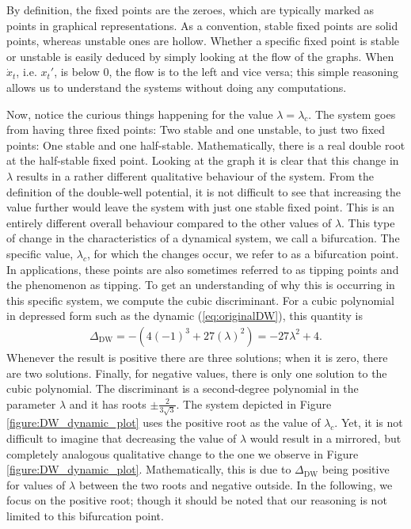 By definition, the fixed points are the zeroes, which are typically marked as points in graphical representations. As a convention, stable fixed points are solid points, whereas unstable ones are hollow. Whether a specific fixed point is stable or unstable is easily deduced by simply looking at the flow of the graphs. When $\dot{x}_t$, i.e. $x_t'$, is below 0, the flow is to the left and vice versa; this simple reasoning allows us to understand the systems without doing any computations.

Now, notice the curious things happening for the value $\lambda = \lambda_c$. The system goes from having three fixed points: Two stable and one unstable, to just two fixed points: One stable and one half-stable. Mathematically, there is a real double root at the half-stable fixed point. Looking at the graph it is clear that this change in $\lambda$ results in a rather different qualitative behaviour of the system. From the definition of the double-well potential, it is not difficult to see that increasing the value further would leave the system with just one stable fixed point. This is an entirely different overall behaviour compared to the other values of $\lambda$. This type of change in the characteristics of a dynamical system, we call a bifurcation. The specific value, $\lambda_c$, for which the changes occur, we refer to as a bifurcation point.\cite{Strogatz2019_gv} In applications, these points are also sometimes referred to as tipping points and the phenomenon as tipping.
To get an understanding of why this is occurring in this specific system, we compute the cubic discriminant. For a cubic polynomial in depressed form such as the dynamic (\ref{eq:originalDW}), this quantity is
\begin{align}
    \Delta_{\mathrm{DW}} = -\left(4(-1)^3+27\left(\lambda\right)^2\right) = -27\lambda^2 + 4. \label{eq:DW_discriminant}
\end{align} 
Whenever the result is positive there are three solutions; when it is zero, there are two solutions. Finally, for negative values, there is only one solution to the cubic polynomial. The discriminant is a second-degree polynomial in the parameter $\lambda$ and it has roots $\pm \frac{2}{3\sqrt{3}}$. The system depicted in Figure \ref{figure:DW_dynamic_plot} uses the positive root as the value of $\lambda_c$. Yet, it is not difficult to imagine that decreasing the value of $\lambda$ would result in a mirrored, but completely analogous qualitative change to the one we observe in Figure \ref{figure:DW_dynamic_plot}. Mathematically, this is due to $\Delta_{\mathrm{DW}}$ being positive for values of $\lambda$ between the two roots and negative outside. In the following, we focus on the positive root; though it should be noted that our reasoning is not limited to this bifurcation point. \\\\
